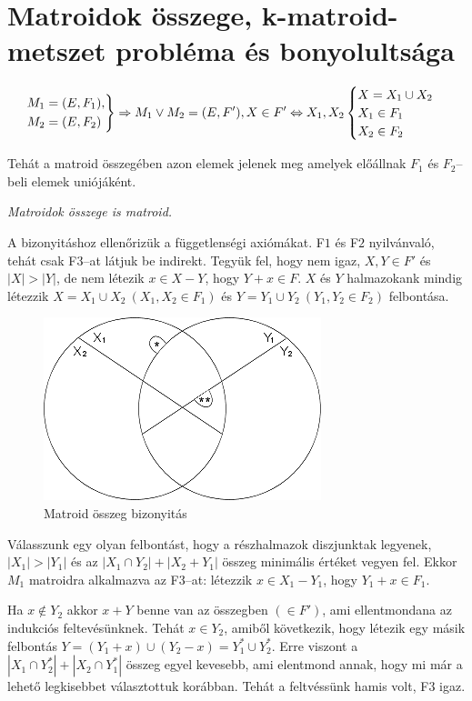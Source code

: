 \section{Matroidok összege, k-matroid-metszet probléma és bonyolultsága}

\[
\begin{rcases}
M_1=(E,F_1), \\
M_2=(E,F_2)
\end{rcases} 
\Rightarrow
M_1 \vee M_2  = (E,F'), X \in F' \Leftrightarrow X_1, X_2 
\begin{cases}
X=X_1 \cup X_2 \\
X_1 \in F_1\\
X_2 \in F_2
\end{cases}
\]

Tehát a matroid összegében azon elemek jelenek meg amelyek előállnak $F_1$ és
$F_2$--beli elemek uniójáként. 

\vspace{0.4cm}
\emph{Matroidok összege is matroid.}
\vspace{0.4cm}

A bizonyitáshoz ellenőrizük a függetlenségi axiómákat. F$1$ és F$2$ nyilvánvaló,
tehát csak F$3$--at látjuk be indirekt. Tegyük fel, hogy nem igaz, $X,Y \in F'$
és $|X|>|Y|$, de nem létezik $x \in X-Y$, hogy $Y+x \in F$. $X$ és $Y$
halmazokank mindig létezzik $X=X_1 \cup X_2~(X_1, X_2 \in F_1)$ és $Y=Y_1 \cup
Y_2~(Y_1, Y_2 \in F_2)$ felbontása.

\begin{figure}[htbp]
\centering
\includegraphics[width=0.4\linewidth]{./kepek/matroidosszeg.png}
\caption{Matroid összeg bizonyitás}\label{fig:Unif}
\end{figure}

Válasszunk egy olyan felbontást, hogy a részhalmazok diszjunktak legyenek,
$|X_1|>|Y_1|$ és az $|X_1 \cap Y_2|+|X_2+Y_1|$ összeg minimális értéket vegyen
fel. Ekkor $M_1$ matroidra alkalmazva az F$3$--at: létezzik $x \in X_1-Y_1$,
hogy $Y_1+x \in F_1$.

Ha $x \not \in Y_2$ akkor $x+Y $ benne van az összegben $(\in F')$, ami
ellentmondana az indukciós feltevésünknek. Tehát $x \in Y_2$, amiből következik,
hogy létezik egy másik felbontás $Y=(Y_1+x) \cup (Y_2 -x)=Y_1^* \cup Y_2^*$.
Erre viszont a $|X_1\cap Y_2^*|+|X_2 \cap Y_1^*|$ összeg egyel kevesebb, ami
elentmond annak, hogy mi már a lehető legkisebbet választottuk korábban. Tehát a
feltvéssünk hamis volt, F$3$ igaz.

